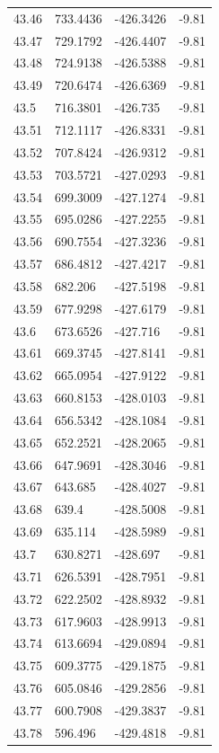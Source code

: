 \begin{table}[H]
\begin{tabular}{llll}
43.46 & 733.4436 & -426.3426 & -9.81 \\
43.47 & 729.1792 & -426.4407 & -9.81 \\
43.48 & 724.9138 & -426.5388 & -9.81 \\
43.49 & 720.6474 & -426.6369 & -9.81 \\
43.5 & 716.3801 & -426.735 & -9.81 \\
43.51 & 712.1117 & -426.8331 & -9.81 \\
43.52 & 707.8424 & -426.9312 & -9.81 \\
43.53 & 703.5721 & -427.0293 & -9.81 \\
43.54 & 699.3009 & -427.1274 & -9.81 \\
43.55 & 695.0286 & -427.2255 & -9.81 \\
43.56 & 690.7554 & -427.3236 & -9.81 \\
43.57 & 686.4812 & -427.4217 & -9.81 \\
43.58 & 682.206 & -427.5198 & -9.81 \\
43.59 & 677.9298 & -427.6179 & -9.81 \\
43.6 & 673.6526 & -427.716 & -9.81 \\
43.61 & 669.3745 & -427.8141 & -9.81 \\
43.62 & 665.0954 & -427.9122 & -9.81 \\
43.63 & 660.8153 & -428.0103 & -9.81 \\
43.64 & 656.5342 & -428.1084 & -9.81 \\
43.65 & 652.2521 & -428.2065 & -9.81 \\
43.66 & 647.9691 & -428.3046 & -9.81 \\
43.67 & 643.685 & -428.4027 & -9.81 \\
43.68 & 639.4 & -428.5008 & -9.81 \\
43.69 & 635.114 & -428.5989 & -9.81 \\
43.7 & 630.8271 & -428.697 & -9.81 \\
43.71 & 626.5391 & -428.7951 & -9.81 \\
43.72 & 622.2502 & -428.8932 & -9.81 \\
43.73 & 617.9603 & -428.9913 & -9.81 \\
43.74 & 613.6694 & -429.0894 & -9.81 \\
43.75 & 609.3775 & -429.1875 & -9.81 \\
43.76 & 605.0846 & -429.2856 & -9.81 \\
43.77 & 600.7908 & -429.3837 & -9.81 \\
43.78 & 596.496 & -429.4818 & -9.81 \\

\end{tabular}
\end{table}
